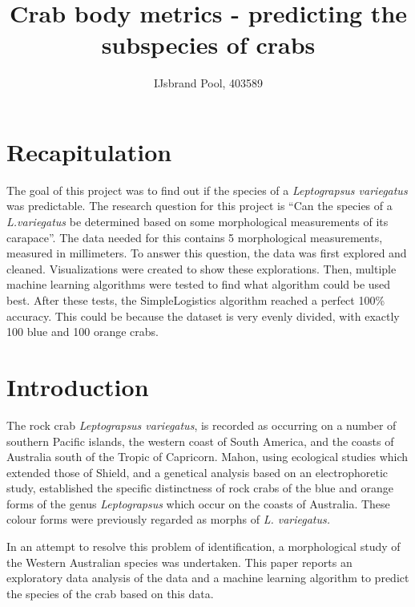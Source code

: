\documentclass[
]{article}
\title{Crab body metrics - predicting the subspecies of crabs}
\author{IJsbrand Pool, 403589}
\date{}
\begin{document}
\maketitle

{
\hypersetup{linkcolor=}
\setcounter{tocdepth}{2}
\tableofcontents
}
\newpage

\hypertarget{recapitulation}{%
\section{Recapitulation}\label{recapitulation}}

The goal of this project was to find out if the species of a
\emph{Leptograpsus variegatus} was predictable. The research question
for this project is ``Can the species of a \emph{L.variegatus} be
determined based on some morphological measurements of its carapace''.
The data needed for this contains 5 morphological measurements, measured
in millimeters. To answer this question, the data was first explored and
cleaned. Visualizations were created to show these explorations. Then,
multiple machine learning algorithms were tested to find what algorithm
could be used best. After these tests, the SimpleLogistics algorithm
reached a perfect 100\% accuracy. This could be because the dataset is
very evenly divided, with exactly 100 blue and 100 orange crabs.

\newpage

\hypertarget{introduction}{%
\section{Introduction}\label{introduction}}

The rock crab \emph{Leptograpsus variegatus}, is recorded as occurring
on a number of southern Pacific islands, the western coast of South
America, and the coasts of Australia south of the Tropic of Capricorn.
Mahon, using ecological studies which extended those of Shield, and a
genetical analysis based on an electrophoretic study, established the
specific distinctness of rock crabs of the blue and orange forms of the
genus \emph{Leptograpsus} which occur on the coasts of Australia. These
colour forms were previously regarded as morphs of \emph{L. variegatus.}

In an attempt to resolve this problem of identification, a morphological
study of the Western Australian species was undertaken. This paper
reports an exploratory data analysis of the data and a machine learning
algorithm to predict the species of the crab based on this data.
\end{document}
